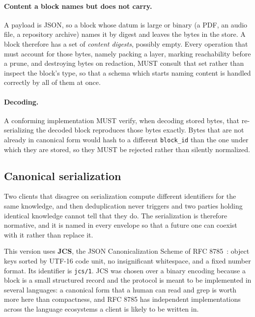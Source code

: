 \documentclass[11pt,a4paper]{article}
\begin{document}
\paragraph{Content a block names but does not carry.}
A payload is JSON, so a block whose datum is large or binary (a PDF, an audio
file, a repository archive) names it by digest and leaves the bytes in the
store. A block therefore has a set of \emph{content digests}, possibly empty.
Every operation that must account for those bytes, namely packing a layer,
marking reachability before a prune, and destroying bytes on redaction, MUST
consult that set rather than inspect the block's type, so that a schema which
starts naming content is handled correctly by all of them at once.

\paragraph{Decoding.}
A conforming implementation MUST verify, when decoding stored bytes, that
re-serializing the decoded block reproduces those bytes exactly. Bytes that are
not already in canonical form would hash to a different \texttt{block\_id} than
the one under which they are stored, so they MUST be rejected rather than
silently normalized.

\subsection{Canonical serialization}
\label{sec:serialization}

Two clients that disagree on serialization compute different identifiers for
the same knowledge, and then deduplication never triggers and two parties
holding identical knowledge cannot tell that they do.
The serialization is therefore normative, and it is named in every envelope so
that a future one can coexist with it rather than replace it.

This version uses \textbf{JCS}, the JSON Canonicalization Scheme of RFC
8785~\cite{rfc8785}: object keys sorted by UTF-16 code unit, no insignificant
whitespace, and a fixed number format. Its identifier is \texttt{jcs/1}. JCS was
chosen over a binary encoding because a block is a small structured record and
the protocol is meant to be implemented in several languages: a canonical form
that a human can read and grep is worth more here than compactness, and RFC 8785
has independent implementations across the language ecosystems a client is
likely to be written in.
\end{document}
